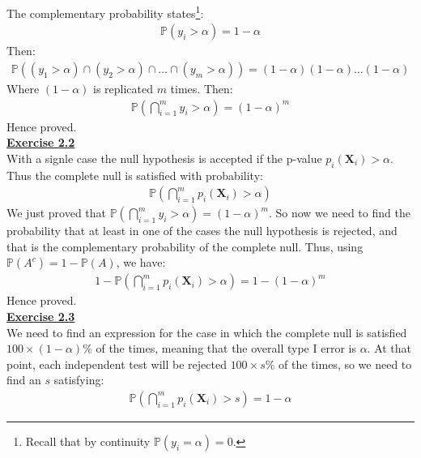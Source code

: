 \documentclass[a4paper, 11pt]{article}
\begin{document}
The complementary probability states\footnote{Recall that by continuity $\mathbb{P}(y_i = \alpha) = 0$.}:
\begin{eqnarray}
\mathbb{P}(y_i > \alpha) = 1 - \alpha \nonumber
\end{eqnarray}
Then:
\begin{eqnarray}
\mathbb{P}((y_1 > \alpha) \cap (y_2 > \alpha) \cap \dots \cap (y_m > \alpha)) = (1 -\alpha)(1 -\alpha) \dots (1 -\alpha) \nonumber
\end{eqnarray}
Where $(1 -\alpha)$ is replicated $m$ times. Then:
\begin{eqnarray}
\mathbb{P} \left(\bigcap_{i=1}^{m} y_i > \alpha \right) = (1-\alpha)^m \nonumber
\end{eqnarray}
Hence proved.\\
\newline \textbf{\underline{Exercise 2.2}}\\
\newline With a signle case the null hypothesis is accepted if the p-value $p_i(\mathbf{X}_i) > \alpha$. Thus the complete null is satisfied with probability:
\begin{eqnarray}
\mathbb{P} \left( \bigcap_{i=1}^{m} p_i(\mathbf{X}_i) > \alpha \right) \nonumber
\end{eqnarray}
We just proved that $\mathbb{P} \left(\bigcap_{i=1}^{m} y_i > \alpha \right) = (1-\alpha)^m$. So now we need to find the probability that at least in one of the cases the null hypothesis is rejected, and that is the complementary probability of the complete null. Thus, using $\mathbb{P}(A^c) = 1 - \mathbb{P}(A)$, we have:
\begin{eqnarray}
1 - \mathbb{P} \left(\bigcap_{i=1}^{m} p_i(\mathbf{X}_i) > \alpha \right) = 1 - (1-\alpha)^m \nonumber
\end{eqnarray}
Hence proved.\\
\newline \textbf{\underline{Exercise 2.3}}\\
\newline We need to find an expression for the case in which the complete null is satisfied $100 \times(1 - \alpha)$\% of the times, meaning that the overall type I error is $\alpha$. At that point, each independent test will be rejected $100 \times s$\% of the times, so we need to find an $s$ satisfying:
\begin{eqnarray}
\mathbb{P} \left( \bigcap_{i=1}^{m} p_i(\mathbf{X}_i) > s \right) = 1 - \alpha \nonumber
\end{eqnarray}
\end{document}
